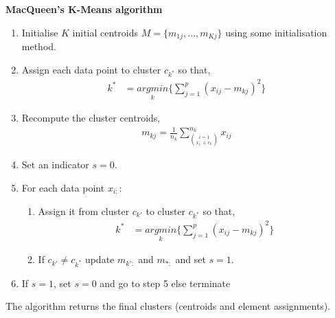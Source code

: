 \documentclass[12pt]{article}
\begin{document}
\begin{center}
	\begin{tcolorbox}[breakable,colback=white!100!white,colframe=black!100!black]
		\noindent\textbf{MacQueen's K-Means algorithm}
		\begin{enumerate}
			\item Initialise $K$ initial centroids $M = \{m_{1j}, \dots, m_{Kj}\}$ using some initialisation method. 
			
			\item Assign each data point to cluster $c_{k^*}$ so that,
			\begin{align}\nonumber
			k^* &= \underset{k}{argmin}\bigg\{ \sum_{j=1}^{p} (x_{ij}-m_{kj})^2    \bigg\}
			\end{align}	
			
			\item Recompute the cluster centroids,
			\begin{align}\nonumber
			m_{kj} = \frac{1}{n_k}\sum_{\binom{i=1}{x_{i:} \in c_k}}^{n_k} x_{ij}
			\end{align}	
			
			\item Set an indicator $s=0$.
			
			\item For each data point $x_{i:}$:
			
			\begin{enumerate}
				\item Assign it from cluster $c_{k'}$ to cluster $c_{k^*}$ so that,
				\begin{align}\nonumber
					k^* &= \underset{k}{argmin}\bigg\{ \sum_{j=1}^{p} (x_{ij}-m_{kj})^2    \bigg\}
				\end{align}	
				\item If $c_{k'} \neq c_{k^*}$ update $m_{k':}$ and $m_{*:}$ and set $s=1$.
			\end{enumerate}
			
			\item If $s=1$, set $s=0$ and go to step 5 else terminate					
			
		\end{enumerate}	
		The algorithm returns the final clusters (centroids and element assignments).
	\end{tcolorbox}
\end{center}
\end{document}
